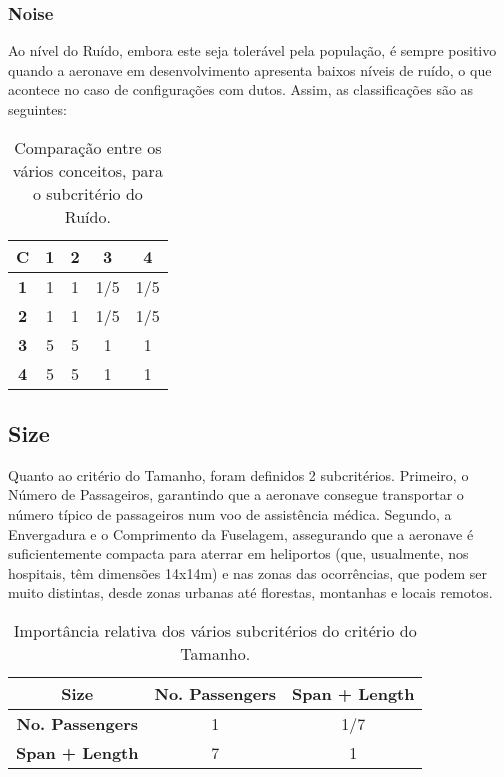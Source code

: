 \subsubsection{Noise}

Ao nível do Ruído, embora este seja tolerável pela população, é sempre positivo quando a aeronave em desenvolvimento apresenta baixos níveis de ruído, o que acontece no caso de configurações com dutos. Assim, as classificações são as seguintes:


\begin{table}[H]
\begin{center}
\caption{Comparação entre os vários conceitos, para o subcritério do Ruído.}
\begin{tabular}{ |c|c c c c| }
 \hline
 \textbf{C} & \textbf{1} & \textbf{2} & \textbf{3} & \textbf{4}  \\
\hline
 \textbf{1} & 1 & 1 & 1/5 & 1/5 \\
 \textbf{2} & 1 & 1 & 1/5 & 1/5  \\
 \textbf{3} & 5 & 5 & 1 & 1  \\
 \textbf{4} & 5 & 5 & 1 & 1  \\
\hline
\end{tabular}
\end{center}
\end{table}





\subsection{Size}

Quanto ao critério do Tamanho, foram definidos 2 subcritérios. Primeiro, o Número de Passageiros, garantindo que a aeronave consegue transportar o número típico de passageiros num voo de assistência médica. Segundo, a Envergadura e o Comprimento da Fuselagem, assegurando que a aeronave é suficientemente compacta para aterrar em heliportos (que, usualmente, nos hospitais, têm dimensões 14x14m) e nas zonas das ocorrências, que podem ser muito distintas, desde zonas urbanas até florestas, montanhas e locais remotos.


\begin{table}[H]
\begin{center}
\caption{Importância relativa dos vários subcritérios do critério do Tamanho.}
\begin{tabular}{ |c|c c| }
 \hline
 \textbf{Size} & \textbf{No. Passengers} & \textbf{Span + Length}  \\
\hline
 \textbf{No. Passengers} & 1 & 1/7  \\
 \textbf{Span + Length} & 7 & 1   \\
\hline
\end{tabular}
\end{center}
\end{table}

